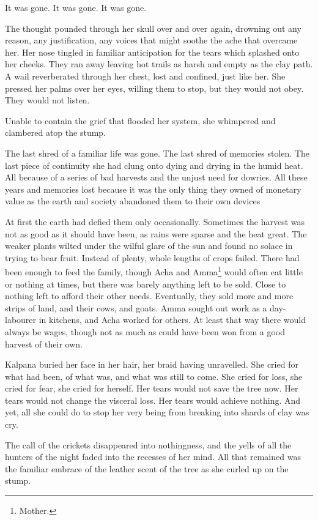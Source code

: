 It was gone. It was gone. It was gone.

The thought pounded through her skull over and over again, drowning
out any reason, any justification, any voices that might soothe the
ache that overcame her. Her nose tingled in familiar anticipation for
the tears which splashed onto her cheeks. They ran away leaving hot
trails as harsh and empty as the clay path. A wail reverberated
through her chest, lost and confined, just like her. She pressed her
palms over her eyes, willing them to stop, but they would not
obey. They would not listen.

Unable to contain the grief that flooded her system, she whimpered and
clambered atop the stump.

The last shred of a familiar life was gone. The last shred of memories
stolen. The last piece of continuity she had clung onto dying and
drying in the humid heat. All because of a series of bad harvests and
the unjust need for dowries. All these years and memories lost because
it was the only thing they owned of monetary value as the earth and
society abandoned them to their own devices

At first the earth had defied them only occasionally. Sometimes the
harvest was not as good as it should have been, as rains were sparse
and the heat great. The weaker plants wilted under the wilful glare of
the sun and found no solace in trying to bear fruit. Instead of
plenty, whole lengths of crops failed. There had been enough to feed
the family, though Acha and Amma\footnote{Mother.} would often eat
little or nothing at times, but there was barely anything left to be
sold. Close to nothing left to afford their other needs. Eventually,
they sold more and more strips of land, and their cows, and
goats. Amma sought out work as a day-labourer in kitchens, and Acha
worked for others. At least that way there would always be wages,
though not as much as could have been won from a good harvest of their
own.

Kalpana buried her face in her hair, her braid having unravelled. She
cried for what had been, of what was, and what was still to come. She
cried for loss, she cried for fear, she cried for herself. Her tears
would not save the tree now. Her tears would not change the visceral
loss. Her tears would achieve nothing. And yet, all she could do to
stop her very being from breaking into shards of clay was cry.

The call of the crickets disappeared into nothingness, and the yells
of all the hunters of the night faded into the recesses of her
mind. All that remained was the familiar embrace of the leather scent
of the tree as she curled up on the stump.

